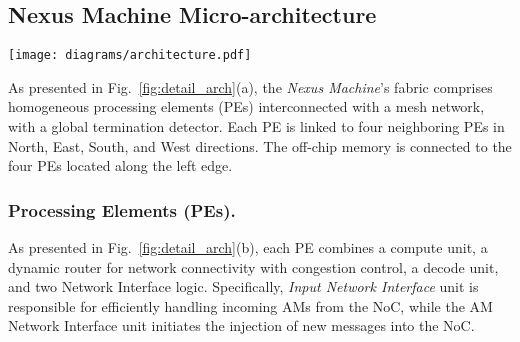 \subsection{Nexus Machine Micro-architecture}
\begin{figure*}[h!]
	\scriptsize
	\centering
	\texttt{[image: diagrams/architecture.pdf]}
    \vspace{-.15cm}
	\caption{\textit{Nexus Machine} microarchitecture. A fabric of homogenous PEs interconnected by a mesh network for communicating Active Messages which carry instructions that can be launched en-route at any PE, enhancing fabric utilization and runtime.} 
    \vspace{-0.3cm}
	\label{fig:detail_arch}
\end{figure*}
As presented in Fig.~\ref{fig:detail_arch}(a), the \textit{Nexus Machine}'s fabric comprises homogeneous processing elements (PEs) interconnected with a mesh network, with a global termination detector. Each PE is linked to four neighboring PEs in North, East, South, and West directions.
The off-chip memory is connected to the four PEs located along the left edge.


\subsubsection{Processing Elements (PEs).}
As presented in Fig.~\ref{fig:detail_arch}(b), each PE combines a compute unit, a dynamic router for network connectivity with congestion control, a decode unit, and two Network Interface logic.
Specifically, \textit{Input Network Interface} unit is responsible for efficiently handling incoming AMs from the NoC, while the AM Network Interface unit initiates the injection of new messages into the NoC.

